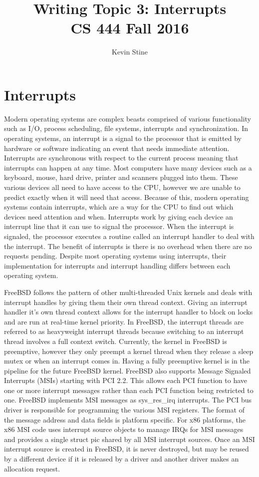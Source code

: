 \documentclass[letterpaper,10pt,draftclsnofoot,onecolumn,titlepage]{IEEEtran}
\def\name{Kevin Stine}
\begin{document}
	\title{\huge Writing Topic 3: Interrupts\\CS 444 Fall 2016}
	\author{\large \name}
	\maketitle
	\newpage
	\section*{Interrupts}
	Modern operating systems are complex beasts comprised of various functionality such as I/O, process scheduling, file systems, interrupts and synchronization.
		In operating systems, an interrupt is a signal to the processor that is emitted by hardware or software indicating an event that needs immediate attention.
			Interrupts are synchronous with respect to the current process meaning that interrupts can happen at any time.
			Most computers have many devices such as a keyboard, mouse, hard drive, printer and scanners plugged into them.
			These various devices all need to have access to the CPU, however we are unable to predict exactly when it will need that access.
			Because of this, modern operating systems contain interrupts, which are a way for the CPU to find out which devices need attention and when.
			Interrupts work by giving each device an interrupt line that it can use to signal the processor.
			When the interrupt is signaled, the processor executes a routine called an interrupt handler to deal with the interrupt.
			The benefit of interrupts is there is no overhead when there are no requests pending.
			Despite most operating systems using interrupts, their implementation for interrupts and interrupt handling differs between each operating system.


			FreeBSD follows the pattern of other multi-threaded Unix kernels and deals with interrupt handles by giving them their own thread context.
			Giving an interrupt handler it's own thread context allows for the interrupt handler to block on locks and are run at real-time kernel priority.
			In FreeBSD, the interrupt threads are referred to as heavyweight interrupt threads because switching to an interrupt thread involves a full context switch.
			Currently, the kernel in FreeBSD is preemptive, however they only preempt a kernel thread when they release a sleep mutex or when an interrupt comes in.
			Having a fully preemptive kernel is in the pipeline for the future FreeBSD kernel.
			FreeBSD also supports Message Signaled Interrupts (MSIs) starting with PCI 2.2. This allows each PCI function to have one or more interrupt messages rather than each PCI function being restricted to one.
			FreeBSD implements MSI messages as sys\_res\_irq interrupts. The PCI bus driver is responsible for programming the various MSI registers.
			The format of the message address and data fields is platform specific.
			For x86 platforms, the x86 MSI code uses interrupt source objects to manage IRQs for MSI messages and provides a single struct pic shared by all MSI interrupt sources.
			Once an MSI interrupt source is created in FreeBSD, it is never destroyed, but may be reused by a different device if it is released by a driver and another driver makes an allocation request.
\end{document}
